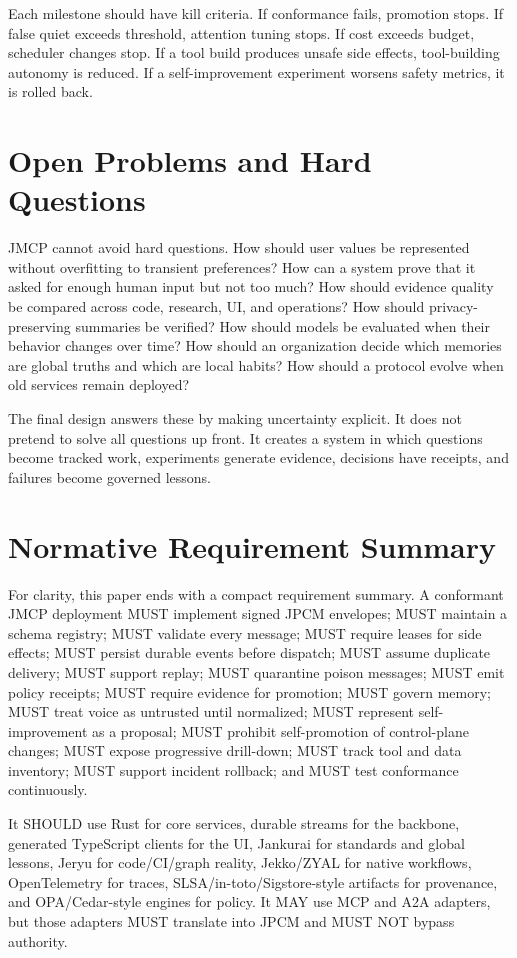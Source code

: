 \documentclass[10pt,journal,onecolumn]{IEEEtran}
\begin{document}
Each milestone should have kill criteria. If conformance fails, promotion stops. If false quiet exceeds threshold, attention tuning stops. If cost exceeds budget, scheduler changes stop. If a tool build produces unsafe side effects, tool-building autonomy is reduced. If a self-improvement experiment worsens safety metrics, it is rolled back.

\section{Open Problems and Hard Questions}
JMCP cannot avoid hard questions. How should user values be represented without overfitting to transient preferences? How can a system prove that it asked for enough human input but not too much? How should evidence quality be compared across code, research, UI, and operations? How should privacy-preserving summaries be verified? How should models be evaluated when their behavior changes over time? How should an organization decide which memories are global truths and which are local habits? How should a protocol evolve when old services remain deployed?

The final design answers these by making uncertainty explicit. It does not pretend to solve all questions up front. It creates a system in which questions become tracked work, experiments generate evidence, decisions have receipts, and failures become governed lessons.

\section{Normative Requirement Summary}
For clarity, this paper ends with a compact requirement summary. A conformant JMCP deployment MUST implement signed JPCM envelopes; MUST maintain a schema registry; MUST validate every message; MUST require leases for side effects; MUST persist durable events before dispatch; MUST assume duplicate delivery; MUST support replay; MUST quarantine poison messages; MUST emit policy receipts; MUST require evidence for promotion; MUST govern memory; MUST treat voice as untrusted until normalized; MUST represent self-improvement as a proposal; MUST prohibit self-promotion of control-plane changes; MUST expose progressive drill-down; MUST track tool and data inventory; MUST support incident rollback; and MUST test conformance continuously.

It SHOULD use Rust for core services, durable streams for the backbone, generated TypeScript clients for the UI, Jankurai for standards and global lessons, Jeryu for code/CI/graph reality, Jekko/ZYAL for native workflows, OpenTelemetry for traces, SLSA/in-toto/Sigstore-style artifacts for provenance, and OPA/Cedar-style engines for policy. It MAY use MCP and A2A adapters, but those adapters MUST translate into JPCM and MUST NOT bypass authority.
\end{document}
